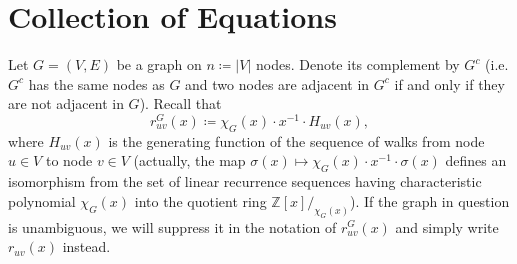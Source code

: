 \documentclass[a4paper,12pt]{article}
\begin{document}
\section{Collection of Equations}

Let $G = (V,E)$ be a graph on $n \coloneqq |V|$ nodes. Denote its complement by $G^c$ (i.e. $G^c$ has the same nodes as $G$ and two nodes are adjacent in $G^c$ if and only if they are not adjacent in $G$). Recall that
$$
r^G_{uv}(x) \coloneqq \chi_G(x) \cdot x^{-1} \cdot H_{uv}(x),
$$
where $H_{uv}(x)$ is the generating function of the sequence of walks from node $u \in V$ to node $v \in V$ (actually, the map $\sigma(x) \mapsto \chi_G(x) \cdot x^{-1} \cdot \sigma(x)$ defines an isomorphism from the set of linear recurrence sequences having characteristic polynomial $\chi_G(x)$ into the quotient ring $\mathbb{Z}[x]/_{\chi_G(x)}$). If the graph in question is unambiguous, we will suppress it in the notation of $r^G_{uv}(x)$ and simply write $r_{uv}(x)$ instead.
\end{document}
